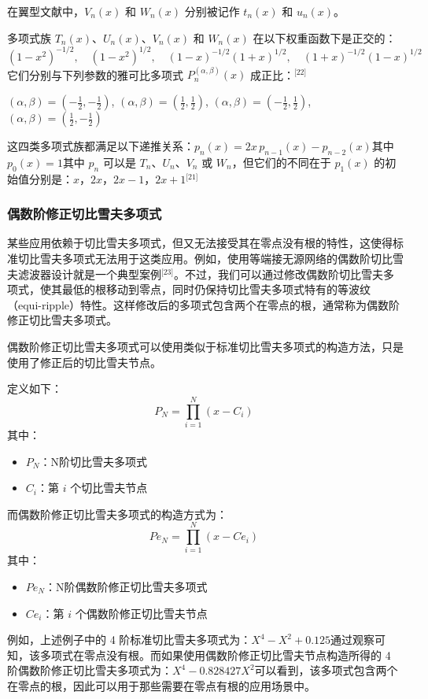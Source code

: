 在翼型文献中，$V_n(x)$ 和 $W_n(x)$ 分别被记作 $t_n(x)$ 和 $u_n(x)$。

多项式族 $T_n(x)$、$U_n(x)$、$V_n(x)$ 和 $W_n(x)$ 在以下权重函数下是正交的：
$$
(1 - x^2)^{-1/2}, \quad (1 - x^2)^{1/2}, \quad (1 - x)^{-1/2}(1 + x)^{1/2}, \quad (1 + x)^{-1/2}(1 - x)^{1/2}~
$$
它们分别与下列参数的雅可比多项式 $P_n^{(\alpha,\beta)}(x)$ 成正比：\(^\text{[22]}\)

$(\alpha, \beta) = \left(-\tfrac{1}{2}, -\tfrac{1}{2} \right)$,
$(\alpha, \beta) = \left( \tfrac{1}{2}, \tfrac{1}{2} \right)$,
$(\alpha, \beta) = \left( -\tfrac{1}{2}, \tfrac{1}{2} \right)$,
$(\alpha, \beta) = \left( \tfrac{1}{2}, -\tfrac{1}{2} \right)$

这四类多项式族都满足以下递推关系：$p_n(x) = 2x\,p_{n-1}(x) - p_{n-2}(x)$其中$p_0(x) = 1$其中 $p_n$ 可以是 $T_n$、$U_n$、$V_n$ 或 $W_n$，但它们的不同在于 $p_1(x)$ 的初始值分别是：$x$，$2x$，$2x - 1$，$2x + 1$\(^\text{[21]}\)
\subsubsection{偶数阶修正切比雪夫多项式}
某些应用依赖于切比雪夫多项式，但又无法接受其在零点没有根的特性，这使得标准切比雪夫多项式无法用于这类应用。例如，使用等端接无源网络的偶数阶切比雪夫滤波器设计就是一个典型案例\(^\text{[23]}\)。不过，我们可以通过修改偶数阶切比雪夫多项式，使其最低的根移动到零点，同时仍保持切比雪夫多项式特有的等波纹（equi-ripple）特性。这样修改后的多项式包含两个在零点的根，通常称为偶数阶修正切比雪夫多项式。

偶数阶修正切比雪夫多项式可以使用类似于标准切比雪夫多项式的构造方法，只是使用了修正后的切比雪夫节点。

定义如下：
$$
P_N = \prod_{i=1}^N (x - C_i)~
$$
其中：
\begin{itemize}
\item $P_N$：N阶切比雪夫多项式
\item $C_i$：第 $i$ 个切比雪夫节点
\end{itemize}

而偶数阶修正切比雪夫多项式的构造方式为：
$$
Pe_N = \prod_{i=1}^N (x - Ce_i)~
$$
其中：
\begin{itemize}
\item $Pe_N$：N阶偶数阶修正切比雪夫多项式
\item $Ce_i$：第 $i$ 个偶数阶修正切比雪夫节点
\end{itemize}
例如，上述例子中的 4 阶标准切比雪夫多项式为：$X^4 - X^2 + 0.125$通过观察可知，该多项式在零点没有根。而如果使用偶数阶修正切比雪夫节点构造所得的 4 阶偶数阶修正切比雪夫多项式为：$X^4 - 0.828427X^2$可以看到，该多项式包含两个在零点的根，因此可以用于那些需要在零点有根的应用场景中。
